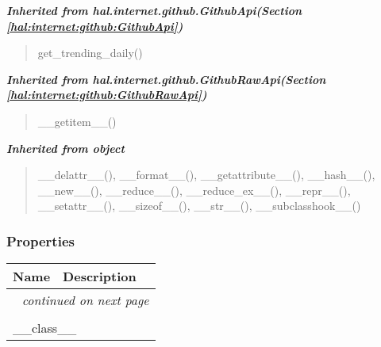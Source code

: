 \large{\textbf{\textit{Inherited from hal.internet.github.GithubApi\textit{(Section \ref{hal:internet:github:GithubApi})}}}}

\begin{quote}
get\_trending\_daily()
\end{quote}

\large{\textbf{\textit{Inherited from hal.internet.github.GithubRawApi\textit{(Section \ref{hal:internet:github:GithubRawApi})}}}}

\begin{quote}
\_\_getitem\_\_()
\end{quote}

\large{\textbf{\textit{Inherited from object}}}

\begin{quote}
\_\_delattr\_\_(), \_\_format\_\_(), \_\_getattribute\_\_(), \_\_hash\_\_(), \_\_new\_\_(), \_\_reduce\_\_(), \_\_reduce\_ex\_\_(), \_\_repr\_\_(), \_\_setattr\_\_(), \_\_sizeof\_\_(), \_\_str\_\_(), \_\_subclasshook\_\_()
\end{quote}


  \subsubsection{Properties}

    \vspace{-1cm}
\hspace{\varindent}\begin{longtable}{|p{\varnamewidth}|p{\vardescrwidth}|l}
\cline{1-2}
\cline{1-2} \centering \textbf{Name} & \centering \textbf{Description}& \\
\cline{1-2}
\endhead\cline{1-2}\multicolumn{3}{r}{\small\textit{continued on next page}}\\\endfoot\cline{1-2}
\endlastfoot\multicolumn{2}{|l|}{\textit{Inherited from object}}\\
\multicolumn{2}{|p{\varwidth}|}{\raggedright \_\_class\_\_}\\
\cline{1-2}
\end{longtable}

